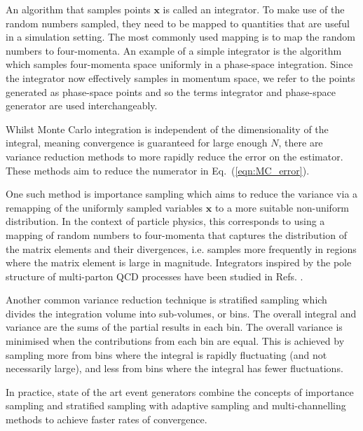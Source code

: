 \documentclass[main.tex]{subfiles}
\begin{document}
    An algorithm that samples points $\mathbf{x}$ is called
    an integrator. To make use of the random numbers sampled,
    they need to be mapped to quantities that are useful in a simulation
    setting. The most commonly used mapping is to map
    the random numbers to four-momenta. An example of a
    simple integrator is the {\RAMBO} algorithm \cite{Kleiss:1985gy,Platzer:2013esa}
    which samples four-momenta space uniformly in a phase-space
    integration. Since the integrator
    now effectively samples in momentum space, we refer to the points
    generated as phase-space points and so the terms integrator
    and phase-space generator are used interchangeably.

    Whilst Monte Carlo integration is independent of the
    dimensionality of the integral, meaning convergence is
    guaranteed for large enough $N$, there are variance
    reduction methods to more rapidly reduce the error
    on the estimator. These methods aim to reduce the numerator
    in Eq.~(\ref{eqn:MC_error}).

    One such method is importance sampling which
    aims to reduce the variance via a remapping of the
    uniformly sampled variables $\mathbf{x}$
    to a more suitable non-uniform distribution.
    In the context of particle physics,
    this corresponds to using a mapping of random numbers
    to four-momenta that captures the distribution of the
    matrix elements and their divergences, i.e. samples
    more frequently in regions where the matrix element
    is large in magnitude. Integrators inspired by the pole
    structure of multi-parton QCD processes have been
    studied in Refs. \cite{Draggiotis:2000gm,vanHameren:2002tc}.
    
    Another common variance reduction technique is
    stratified sampling which divides the integration
    volume into sub-volumes, or bins. The overall integral
    and variance are the sums of the partial results
    in each bin. The overall variance is minimised when
    the contributions from each bin are equal. This
    is achieved by sampling more from bins where the integral
    is rapidly fluctuating (and not necessarily large),
    and less from bins where the integral has fewer fluctuations.
    
    In practice, state of the art event generators
    combine the concepts of importance sampling and stratified
    sampling with adaptive sampling \cite{Lepage:1977sw,Lepage:2020tgj}
    and multi-channelling methods \cite{Kleiss:1994qy,Ohl:1998jn}
    to achieve faster rates of convergence.
\end{document}
